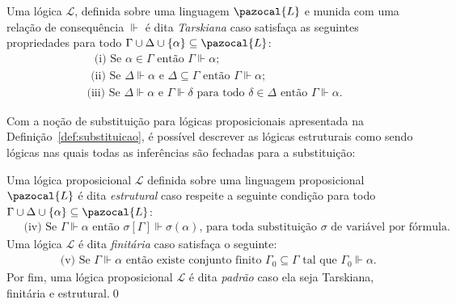 \begin{definicao}
    \begin{definicao}
        \label{def:tarski}
        Uma lógica $\mathcal{L}$, definida sobre uma linguagem $\pazocal{L}$ e munida com uma relação de consequência $\Vdash$ é dita \textit{Tarskiana} caso satisfaça as seguintes propriedades para todo $\Gamma \cup \Delta \cup \{\alpha\} \subseteq \pazocal{L}$:
        \begin{align}
            & \text{~~(i) Se } \alpha \in \Gamma \text{ então } \Gamma \Vdash \alpha;\tag{reflexividade}                                                                                       \\
            & \text{~(ii) Se } \Delta \Vdash \alpha \text{ e } \Delta \subseteq \Gamma \text{ então } \Gamma \Vdash \alpha;\tag{monotonicidade}                                                \\
            & \text{(iii) Se } \Delta \Vdash \alpha \text{ e } \Gamma \Vdash \delta \text{ para todo } \delta \in \Delta \text{ então } \Gamma \Vdash \alpha.\tag{corte para conjuntos}
        \end{align}

        Com a noção de substituição para lógicas proposicionais apresentada na Definição~\ref{def:substituicao}, é possível descrever as lógicas estruturais como sendo lógicas nas quais todas as inferências são fechadas para a substituição:

        Uma lógica proposicional $\mathcal{L}$ definida sobre uma linguagem proposicional $\pazocal{L}$ é dita \textit{estrutural} caso respeite a seguinte condição para todo $\Gamma \cup \Delta \cup \{\alpha\} \subseteq \pazocal{L}$:
        \begin{align*}
            & \text{~(iv) Se } \Gamma \Vdash \alpha \text{ então } \sigma [\Gamma] \Vdash \sigma(\alpha) \text{, para toda substituição } \sigma \text{ de variável por fórmula.}
        \end{align*}
        Uma lógica $\mathcal{L}$ é dita \textit{finitária} caso satisfaça o seguinte:
        \begin{align*}
            & \text{~~(v) Se } \Gamma \Vdash \alpha \text{ então existe conjunto finito } \Gamma_{0} \subseteq \Gamma \text{ tal que } \Gamma_{0} \Vdash \alpha.
        \end{align*}
        Por fim, uma lógica proposicional $\mathcal{L}$ é dita \textit{padrão} caso ela seja Tarskiana, finitária e estrutural.\qed{}
    \end{definicao}



\end{definicao}
